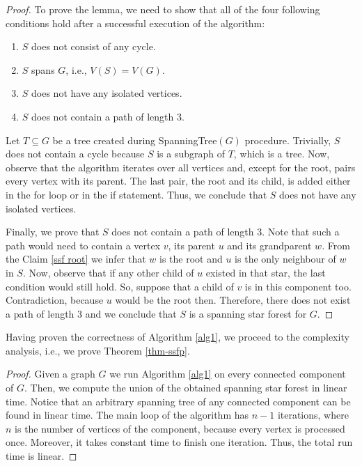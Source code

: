 \documentclass[en]{pracamgr}
\theoremstyle{definition}
\newcommand{\ssf}{spanning star forest}
\begin{document}
\begin{proof}
	To prove the lemma, we need to show that all of the four following conditions hold after a successful execution of the algorithm:
	\begin{enumerate}
		\item $S$ does not consist of any cycle.
		\item $S$ spans $G$, i.e., $V(S) = V(G)$.
		\item $S$ does not have any isolated vertices.
		\item $S$ does not contain a path of length $3$.
	\end{enumerate}
	Let $T \subseteq G$ be a tree created during \textrm{SpanningTree}$(G)$ procedure. Trivially, $S$ does not contain a cycle because $S$ is a subgraph of $T$, which is a tree. Now, observe that the algorithm iterates over all vertices and, except for the root, pairs every vertex with its parent. The last pair, the root and its child, is added either in the for loop or in the if statement. Thus, we conclude that $S$ does not have any isolated vertices. 
	
	Finally, we prove that $S$ does not contain a path of length $3$. Note that such a path would need to contain a vertex $v$, its parent $u$ and its grandparent $w$. From the Claim \ref{ssf root} we infer that $w$ is the root and $u$ is the only neighbour of $w$ in $S$. Now, observe that if any other child of $u$ existed in that star, the last condition would still hold. So, suppose that a child of $v$ is in this component too. Contradiction, because $u$ would be the root then.
	Therefore, there does not exist a path of length $3$ and we conclude that $S$ is a spanning star forest for $G$. 
\end{proof}

Having proven the correctness of Algorithm \ref{alg1}, we proceed to the complexity analysis, i.e., we prove Theorem \ref{thm-ssfp}.

\thmssfp*

\begin{proof}
	Given a graph $G$ we run Algorithm \ref{alg1} on every connected component of $G$. Then, we compute the union of the obtained \ssf{} in linear time. Notice that an arbitrary spanning tree of any connected component can be found in linear time. The main loop of the algorithm has $n-1$ iterations, where $n$ is the number of vertices of the component, because every vertex is processed once. Moreover, it takes constant time to finish one iteration. Thus, the total run time is linear.
\end{proof}
\end{document}

